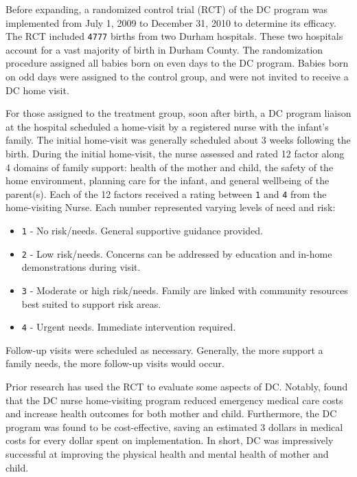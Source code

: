\documentclass[12pt,letterpaperpaper,]{book}
\providecommand{\tightlist}{%
  \setlength{\itemsep}{0pt}\setlength{\parskip}{0pt}}
\begin{document}
Before expanding, a randomized control trial (RCT) of the DC program was
implemented from July 1, 2009 to December 31, 2010 to determine its
efficacy. The RCT included \texttt{4777} births from two Durham
hospitals. These two hospitals account for a vast majority of birth in
Durham County. The randomization procedure assigned all babies born on
even days to the DC program. Babies born on odd days were assigned to
the control group, and were not invited to receive a DC home visit.

For those assigned to the treatment group, soon after birth, a DC
program liaison at the hospital scheduled a home-visit by a registered
nurse with the infant's family. The initial home-visit was generally
scheduled about 3 weeks following the birth. During the initial
home-visit, the nurse assessed and rated 12 factor along 4 domains of
family support: health of the mother and child, the safety of the home
environment, planning care for the infant, and general wellbeing of the
parent(s). Each of the 12 factors received a rating between \texttt{1}
and \texttt{4} from the home-visiting Nurse. Each number represented
varying levels of need and risk:

\begin{itemize}
\tightlist
\item
  \texttt{1} - No risk/needs. General supportive guidance provided.
\item
  \texttt{2} - Low risk/needs. Concerns can be addressed by education
  and in-home demonstrations during visit.
\item
  \texttt{3} - Moderate or high risk/needs. Family are linked with
  community resources best suited to support risk areas.
\item
  \texttt{4} - Urgent needs. Immediate intervention required.
\end{itemize}

Follow-up visits were scheduled as necessary. Generally, the more
support a family needs, the more follow-up visits would occur.

Prior research has used the RCT to evaluate some aspects of DC. Notably,
\citet{dodge_implementation_2013} found that the DC nurse home-visiting
program reduced emergency medical care costs and increase health
outcomes for both mother and child. Furthermore, the DC program was
found to be cost-effective, saving an estimated 3 dollars in medical
costs for every dollar spent on implementation. In short, DC was
impressively successful at improving the physical health and mental
health of mother and child.
\end{document}
